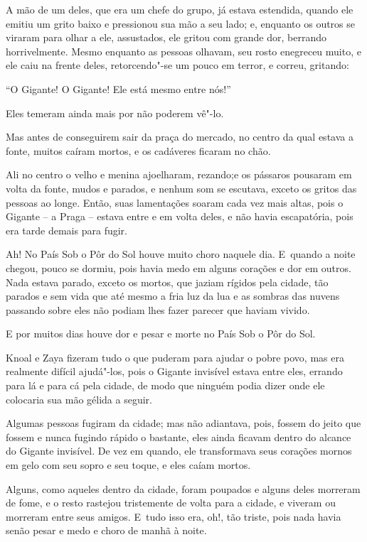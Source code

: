 A mão de um deles, que era um chefe do grupo, já estava estendida,
quando ele emitiu um grito baixo e pressionou sua mão a seu lado; e,
enquanto os outros se viraram para olhar a ele, assustados, ele gritou
com grande dor, berrando horrivelmente. Mesmo enquanto as pessoas
olhavam, seu rosto enegreceu muito, e ele caiu na frente deles,
retorcendo"-se um pouco em terror, e correu, gritando:

``O Gigante! O Gigante! Ele está mesmo entre nós!''

Eles temeram ainda mais por não poderem vê"-lo.

Mas antes de conseguirem sair da praça do mercado, no centro da qual
estava a fonte, muitos caíram mortos, e os cadáveres ficaram no chão.

Ali no centro o velho e menina ajoelharam, rezando;e os pássaros
pousaram em volta da fonte, mudos e parados, e nenhum som se escutava,
exceto os gritos das pessoas ao longe. Então, suas lamentações soaram
cada vez mais altas, pois o Gigante -- a Praga -- estava entre e em
volta deles, e não havia escapatória, pois era tarde demais para fugir.

Ah! No País Sob o Pôr do Sol houve muito choro naquele dia. E~quando a
noite chegou, pouco se dormiu, pois havia medo em alguns corações e dor
em outros. Nada estava parado, exceto os mortos, que jaziam rígidos pela
cidade, tão parados e sem vida que até mesmo a fria luz da lua e as
sombras das nuvens passando sobre eles não podiam lhes fazer parecer que
haviam vivido.

E por muitos dias houve dor e pesar e morte no País Sob o Pôr do Sol.

Knoal e Zaya fizeram tudo o que puderam para ajudar o pobre povo, mas
era realmente difícil ajudá"-los, pois o Gigante invisível estava entre
eles, errando para lá e para cá pela cidade, de modo que ninguém podia
dizer onde ele colocaria sua mão gélida a seguir.

Algumas pessoas fugiram da cidade; mas não adiantava, pois, fossem do
jeito que fossem e nunca fugindo rápido o bastante, eles ainda ficavam
dentro do alcance do Gigante invisível. De vez em quando, ele
transformava seus corações mornos em gelo com seu sopro e seu toque, e
eles caíam mortos.

Alguns, como aqueles dentro da cidade, foram poupados e alguns deles
morreram de fome, e o resto rastejou tristemente de volta para a cidade,
e viveram ou morreram entre seus amigos. E~tudo isso era, oh!, tão
triste, pois nada havia senão pesar e medo e choro de manhã à noite.

